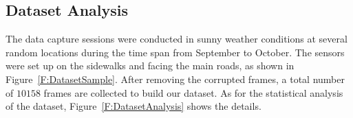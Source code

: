 \documentclass[10pt, conference, compsocconf]{IEEEtran}
\begin{document}





\subsection{Dataset Analysis}


The data capture sessions were conducted in sunny weather conditions at several random locations during the time span from September to October. The sensors were set up on the sidewalks and facing the main roads, as shown in Figure~\ref{F:DatasetSample}. 
After removing the corrupted frames, a total number of $10158$ frames are collected to build our dataset.
As for the statistical analysis of the dataset, Figure~\ref{F:DatasetAnalysis} shows the details.
\end{document}
